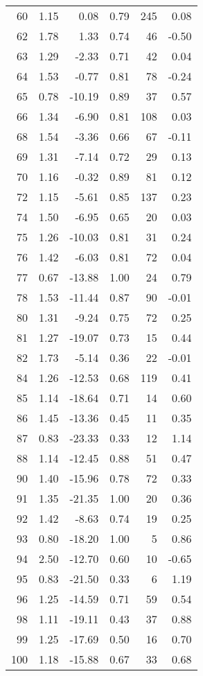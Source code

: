 \begin{appendices}
\begin{longtable}[c]{@{}rrrrrr@{}}
60 & 1.15 & 0.08 & 0.79 & 245 & 0.08 \\
62 & 1.78 & 1.33 & 0.74 & 46 & -0.50 \\
63 & 1.29 & -2.33 & 0.71 & 42 & 0.04 \\
64 & 1.53 & -0.77 & 0.81 & 78 & -0.24 \\
65 & 0.78 & -10.19 & 0.89 & 37 & 0.57 \\
66 & 1.34 & -6.90 & 0.81 & 108 & 0.03 \\
68 & 1.54 & -3.36 & 0.66 & 67 & -0.11 \\
69 & 1.31 & -7.14 & 0.72 & 29 & 0.13 \\
70 & 1.16 & -0.32 & 0.89 & 81 & 0.12 \\
72 & 1.15 & -5.61 & 0.85 & 137 & 0.23 \\
74 & 1.50 & -6.95 & 0.65 & 20 & 0.03 \\
75 & 1.26 & -10.03 & 0.81 & 31 & 0.24 \\
76 & 1.42 & -6.03 & 0.81 & 72 & 0.04 \\
77 & 0.67 & -13.88 & 1.00 & 24 & 0.79 \\
78 & 1.53 & -11.44 & 0.87 & 90 & -0.01 \\
80 & 1.31 & -9.24 & 0.75 & 72 & 0.25 \\
81 & 1.27 & -19.07 & 0.73 & 15 & 0.44 \\
82 & 1.73 & -5.14 & 0.36 & 22 & -0.01 \\
84 & 1.26 & -12.53 & 0.68 & 119 & 0.41 \\
85 & 1.14 & -18.64 & 0.71 & 14 & 0.60 \\
86 & 1.45 & -13.36 & 0.45 & 11 & 0.35 \\
87 & 0.83 & -23.33 & 0.33 & 12 & 1.14 \\
88 & 1.14 & -12.45 & 0.88 & 51 & 0.47 \\
90 & 1.40 & -15.96 & 0.78 & 72 & 0.33 \\
91 & 1.35 & -21.35 & 1.00 & 20 & 0.36 \\
92 & 1.42 & -8.63 & 0.74 & 19 & 0.25 \\
93 & 0.80 & -18.20 & 1.00 & 5 & 0.86 \\
94 & 2.50 & -12.70 & 0.60 & 10 & -0.65 \\
95 & 0.83 & -21.50 & 0.33 & 6 & 1.19 \\
96 & 1.25 & -14.59 & 0.71 & 59 & 0.54 \\
98 & 1.11 & -19.11 & 0.43 & 37 & 0.88 \\
99 & 1.25 & -17.69 & 0.50 & 16 & 0.70 \\
100 & 1.18 & -15.88 & 0.67 & 33 & 0.68 \\

\end{longtable}
\end{appendices}
